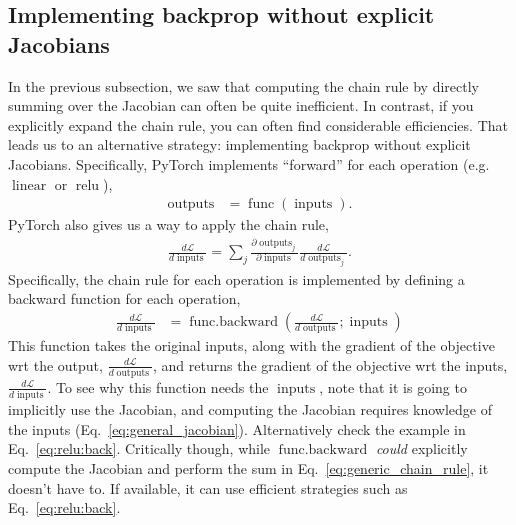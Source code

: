 \documentclass{article}
\newcommand{\dd}[2][]{\frac{\partial #1}{\partial #2}}
\newcommand{\dt}[2][]{\frac{d #1}{d #2}}
\newcommand{\dL}{\dt[\L]}
\newcommand{\bracket}[3]{\left#1 #3 \right#2}
\renewcommand{\b}{\bracket{(}{)}}
\renewcommand{\L}{\mathcal{L}}
\newcommand{\linear}{\operatorname{linear}}
\newcommand{\relu}{\operatorname{relu}}
\newcommand{\func}{\operatorname{func}}
\newcommand{\funcback}{\operatorname{func{.}backward}}
\newcommand{\inputs}{\operatorname{inputs}}
\newcommand{\outputs}{\operatorname{outputs}}
\begin{document}
\subsection{Implementing backprop without explicit Jacobians}
In the previous subsection, we saw that computing the chain rule by directly summing over the Jacobian can often be quite inefficient.
In contrast, if you explicitly expand the chain rule, you can often find considerable efficiencies.
That leads us to an alternative strategy: implementing backprop without explicit Jacobians.
Specifically, PyTorch implements ``forward'' for each operation (e.g.\ $\linear$ or $\relu$),
\begin{align}
  \outputs &= \func\b{\inputs}.
\end{align}
PyTorch also gives us a way to apply the chain rule,
\begin{align}
  \label{eq:generic_chain_rule}
  \dL{\inputs} = \sum_j \dd[\outputs_j]{\inputs} \dL{\outputs_j}.
\end{align}
Specifically, the chain rule for each operation is implemented by defining a backward function for each operation,
\begin{align}
\label{eq:general_forward_backward}
  \dL{\inputs} &= \funcback\b{\dL{\outputs}; \inputs}
\end{align}
This function takes the original inputs, along with the gradient of the objective wrt the output, $\dL{\outputs}$, and returns the gradient of the objective wrt the inputs, $\dL{\inputs}$.
To see why this function needs the $\inputs$, note that it is going to implicitly use the Jacobian, and computing the Jacobian requires knowledge of the inputs (Eq.~\ref{eq:general_jacobian}). 
Alternatively check the example in Eq.~\ref{eq:relu:back}.
Critically though, while $\funcback$ \textit{could} explicitly compute the Jacobian and perform the sum in Eq.~\eqref{eq:generic_chain_rule}, it doesn't have to.  
If available, it can use efficient strategies such as Eq.~\eqref{eq:relu:back}.
\end{document}
